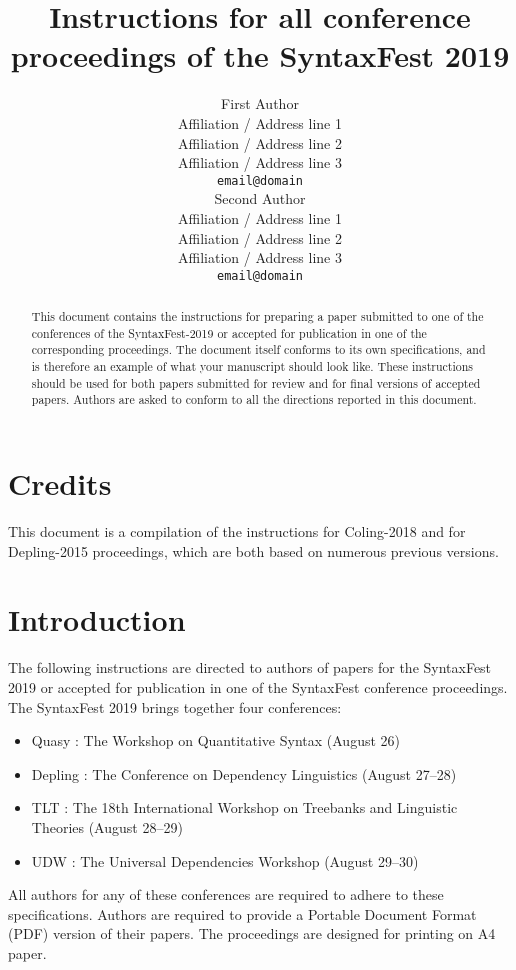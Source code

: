\documentclass[11pt]{article}
\title{Instructions for all conference proceedings of the SyntaxFest 2019}
\author{First Author \\
  Affiliation / Address line 1 \\
  Affiliation / Address line 2 \\
  Affiliation / Address line 3 \\
  \texttt{email@domain} \\\And
  Second Author \\
  Affiliation / Address line 1 \\
  Affiliation / Address line 2 \\
  Affiliation / Address line 3 \\
  \texttt{email@domain} \\}
\date{}
\begin{document}
\maketitle
\begin{abstract}
This document contains the instructions for preparing a paper submitted to one of the conferences of the SyntaxFest-2019 or accepted for publication in one of the corresponding proceedings. The document itself conforms to its own specifications, and is therefore an example of what your manuscript should look like. These instructions should be used for both papers submitted for review and for final versions of accepted papers. Authors are asked to conform to all the directions reported in this document.
\end{abstract}



\section{Credits}

This document is a compilation of the instructions for Coling-2018 and for Depling-2015 proceedings, which are both based on numerous previous versions.



\section{Introduction}
\label{intro}

The following instructions are directed to authors of papers for the SyntaxFest 2019 or accepted for publication in one of the SyntaxFest conference proceedings. The SyntaxFest 2019 brings together four conferences: 
\begin{itemize}
\item Quasy : The Workshop on Quantitative Syntax (August 26)
\item Depling : The Conference on Dependency Linguistics (August 27--28)
\item TLT : The 18th International Workshop on Treebanks and Linguistic Theories (August 28--29)
\item UDW : The Universal Dependencies Workshop (August 29--30)
\end{itemize}
All authors for any of these conferences are required to adhere to these specifications. Authors are required to provide a Portable Document Format (PDF) version of their papers. The proceedings are designed for printing on A4 paper.
\end{document}
